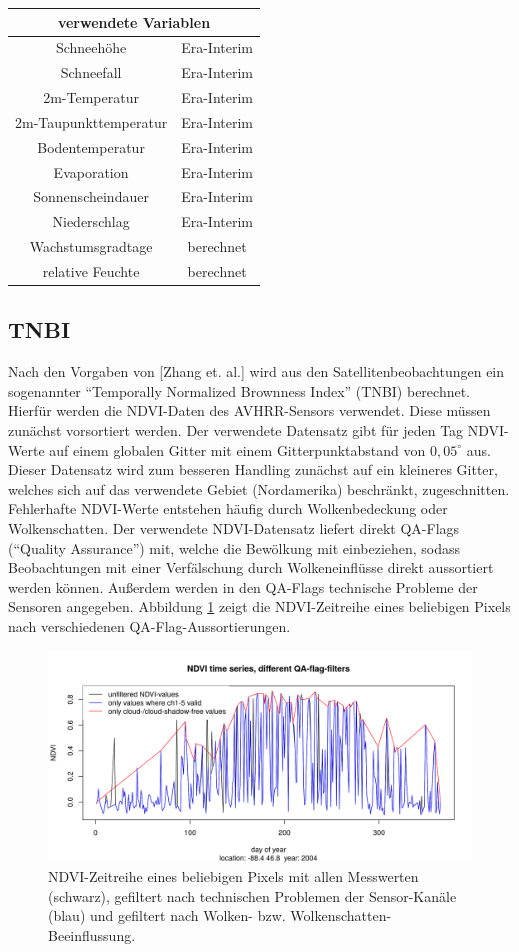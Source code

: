 \documentclass[]{article}
\begin{document}
\begin{tabular}{|c|c|}
	\multicolumn{2}{c}{verwendete Variablen}\\
	\hline
	Schneehöhe& Era-Interim\\
	\hline
	Schneefall& Era-Interim\\
	\hline
	2m-Temperatur& Era-Interim \\
	\hline
	2m-Taupunkttemperatur& Era-Interim\\
	\hline
	Bodentemperatur&Era-Interim\\
	\hline
	Evaporation& Era-Interim\\
	\hline
	Sonnenscheindauer& Era-Interim\\
	\hline
	Niederschlag& Era-Interim\\
	\hline
	Wachstumsgradtage& berechnet\\
	\hline
	relative Feuchte& berechnet\\
	\hline
\end{tabular}

\subsection{TNBI}
Nach den Vorgaben von [Zhang et. al.] wird aus den Satellitenbeobachtungen ein sogenannter \enquote{Temporally Normalized Brownness Index} (TNBI) berechnet. Hierfür werden die NDVI-Daten des AVHRR-Sensors verwendet. Diese müssen zunächst vorsortiert werden. Der verwendete Datensatz gibt für jeden Tag NDVI-Werte auf einem globalen Gitter mit einem Gitterpunktabstand von $0,05^\circ$ aus. Dieser Datensatz wird zum besseren Handling zunächst auf ein kleineres Gitter, welches sich auf das verwendete Gebiet (Nordamerika) beschränkt, zugeschnitten. Fehlerhafte NDVI-Werte entstehen häufig durch Wolkenbedeckung oder Wolkenschatten. Der verwendete NDVI-Datensatz liefert direkt QA-Flags (\enquote{Quality Assurance}) mit, welche die Bewölkung mit einbeziehen, sodass Beobachtungen mit einer Verfälschung durch Wolkeneinflüsse direkt aussortiert werden können. Außerdem werden in den QA-Flags technische Probleme der Sensoren angegeben. Abbildung \ref{QAfig} zeigt die NDVI-Zeitreihe eines beliebigen Pixels nach verschiedenen QA-Flag-Aussortierungen.

\begin{figure}
  \includegraphics[width=1.\textwidth]{QAf.png}
	\caption{NDVI-Zeitreihe eines beliebigen Pixels mit allen Messwerten (schwarz), gefiltert nach technischen Problemen der Sensor-Kanäle (blau) und gefiltert nach Wolken- bzw. Wolkenschatten-Beeinflussung.}
	\label{QAfig}
\end{figure}
\end{document}
